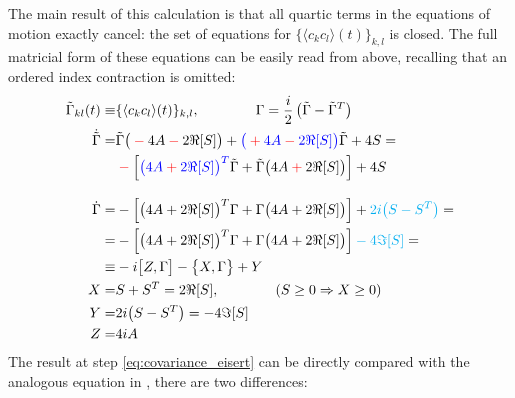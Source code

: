 \documentclass[a4paper,11pt]{article}
\theoremstyle{remark}
\newcommand{\mean}[1]{\ensuremath{\langle #1 \rangle}}
\newcommand*{\mathcolor}{}  %
\def\mathcolor#1#{\mathcoloraux{#1}}
\newcommand*{\mathcoloraux}[3]{%
  \protect\leavevmode
  \begingroup
    \color#1{#2}#3%
  \endgroup
}
\begin{document}
   The main result of this calculation is that all quartic terms in the equations of motion exactly cancel: the set of equations for $\{\mean{c_kc_l}(t)\}_{k,l}$ is closed. The full matricial form of these equations can be easily read from above, recalling that an ordered index contraction is omitted:
   \begin{subequations}
   \label{eq:covariance_qme}
   \begin{align}
    \tilde{\Gamma}_{kl}(t) \equiv & \{\mean{c_kc_l}(t)\}_{k,l},\quad\quad\quad\quad \Gamma = \frac{i}{2}\left(\tilde{\Gamma}-\tilde{\Gamma}^T\right) \notag\\
    \dot{\tilde{\Gamma}} =&\tilde{\Gamma}\big(\mathcolor{red}{-}4A\mathcolor{red}{-}2\Re[S]\big) + \mathcolor{blue}{\big(\mathcolor{red}{+}4A\mathcolor{red}{-}2\Re[S]\big)}\tilde{\Gamma} + 4S=\notag\\ &\mathcolor{red}{-}\left[\mathcolor{blue}{\big(4A\mathcolor{red}{+}2\Re[S]\big)^{T}}\tilde{\Gamma}+\tilde{\Gamma}\big(4A\mathcolor{red}{+}2\Re[S]\big)\right] +4S  \notag\\[0.3cm]
    \dot{\Gamma}=& -\left[\big(4A+2\Re[S]\big)^{T}\Gamma+\Gamma\big(4A+2\Re[S]\big)\right]+\mathcolor{cyan}{2i\big(S-S^T\big)}=\notag\\
                =& -\left[\big(4A+2\Re[S]\big)^{T}\Gamma+\Gamma\big(4A+2\Re[S]\big)\right]\mathcolor{cyan}{-4\Im[S]}=\label{eq:covariance_eisert}\\
                \equiv& -i\big[Z,\Gamma\big] - \big\{X,\Gamma\big\}+Y\label{eq:covariance_qme_compact}\\
    X =& S+S^T = 2\Re[S], \quad\quad\quad\quad (S\geq 0\Rightarrow X\geq 0) \notag\\
    Y =& 2i\big(S-S^T\big) = -4\Im[S] \notag \\
    Z =& 4iA \notag
   \end{align}
   \end{subequations}
   The result at step \ref{eq:covariance_eisert} can be directly compared with the analogous equation in \cite{Eisert2010}, there are two differences: 
\end{document}
